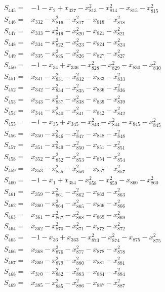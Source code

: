 \begin{align*}
S_{445}={}&-1-x_{2}+x_{327}-x_{813}^{2}-x_{814}^{2}-x_{815}-x_{815}^{2}\\[3pt]
S_{446}={}&x_{332}-x_{816}^{2}-x_{817}^{2}-x_{818}-x_{818}^{2}\\[3pt]
S_{447}={}&x_{333}-x_{819}^{2}-x_{820}^{2}-x_{821}-x_{821}^{2}\\[3pt]
S_{448}={}&x_{334}-x_{822}^{2}-x_{823}^{2}-x_{824}-x_{824}^{2}\\[3pt]
S_{449}={}&x_{335}-x_{825}^{2}-x_{826}^{2}-x_{827}-x_{827}^{2}\\[3pt]
S_{450}={}&-1-x_{34}+x_{336}-x_{828}^{2}-x_{829}^{2}-x_{830}-x_{830}^{2}\\[3pt]
S_{451}={}&x_{341}-x_{831}^{2}-x_{832}^{2}-x_{833}-x_{833}^{2}\\[3pt]
S_{452}={}&x_{342}-x_{834}^{2}-x_{835}^{2}-x_{836}-x_{836}^{2}\\[3pt]
S_{453}={}&x_{343}-x_{837}^{2}-x_{838}^{2}-x_{839}-x_{839}^{2}\\[3pt]
S_{454}={}&x_{344}-x_{840}^{2}-x_{841}^{2}-x_{842}-x_{842}^{2}\\[3pt]
S_{455}={}&-1-x_{35}+x_{345}-x_{843}^{2}-x_{844}^{2}-x_{845}-x_{845}^{2}\\[3pt]
S_{456}={}&x_{350}-x_{846}^{2}-x_{847}^{2}-x_{848}-x_{848}^{2}\\[3pt]
S_{457}={}&x_{351}-x_{849}^{2}-x_{850}^{2}-x_{851}-x_{851}^{2}\\[3pt]
S_{458}={}&x_{352}-x_{852}^{2}-x_{853}^{2}-x_{854}-x_{854}^{2}\\[3pt]
S_{459}={}&x_{353}-x_{855}^{2}-x_{856}^{2}-x_{857}-x_{857}^{2}\\[3pt]
S_{460}={}&-1-x_{1}+x_{354}-x_{858}^{2}-x_{859}^{2}-x_{860}-x_{860}^{2}\\[3pt]
S_{461}={}&x_{359}-x_{861}^{2}-x_{862}^{2}-x_{863}-x_{863}^{2}\\[3pt]
S_{462}={}&x_{360}-x_{864}^{2}-x_{865}^{2}-x_{866}-x_{866}^{2}\\[3pt]
S_{463}={}&x_{361}-x_{867}^{2}-x_{868}^{2}-x_{869}-x_{869}^{2}\\[3pt]
S_{464}={}&x_{362}-x_{870}^{2}-x_{871}^{2}-x_{872}-x_{872}^{2}\\[3pt]
S_{465}={}&-1-x_{36}+x_{363}-x_{873}^{2}-x_{874}^{2}-x_{875}-x_{875}^{2}\\[3pt]
S_{466}={}&x_{368}-x_{876}^{2}-x_{877}^{2}-x_{878}-x_{878}^{2}\\[3pt]
S_{467}={}&x_{369}-x_{879}^{2}-x_{880}^{2}-x_{881}-x_{881}^{2}\\[3pt]
S_{468}={}&x_{370}-x_{882}^{2}-x_{883}^{2}-x_{884}-x_{884}^{2}\\[3pt]
S_{469}={}&x_{385}-x_{885}^{2}-x_{886}^{2}-x_{887}-x_{887}^{2}\\[3pt]
\end{align*}
\endgroup
